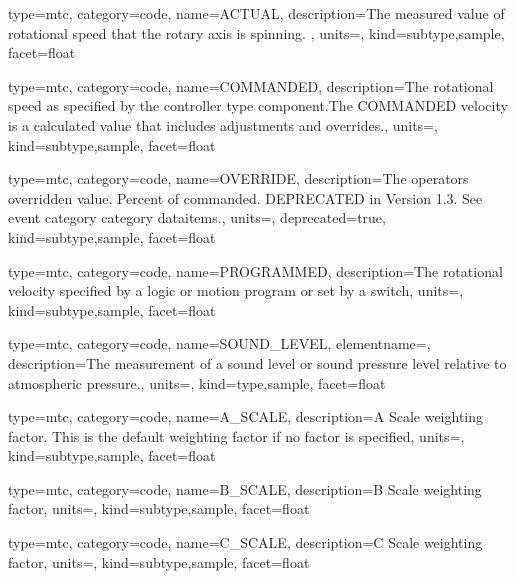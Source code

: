 {
  type=mtc,
  category=code,
  name={ACTUAL},
  description={The measured value of rotational speed that the rotary axis is spinning. },
  units=,
  kind={subtype,sample},
  facet={\gls{float}}
}


{
  type=mtc,
  category=code,
  name={COMMANDED},
  description={The rotational speed as specified by the \gls{controller} type component.The COMMANDED velocity is a calculated value that includes adjustments and overrides.},
  units=,
  kind={subtype,sample},
  facet={\gls{float}}
}


{
  type=mtc,
  category=code,
  name={OVERRIDE},
  description={The operators overridden value.  Percent of commanded. DEPRECATED in Version 1.3.   See \gls{event category} category \glspl{dataitem}.},
  units=,
  deprecated={true},
  kind={subtype,sample},
  facet={\gls{float}}
}


{
  type=mtc,
  category=code,
  name={PROGRAMMED},
  description={The rotational velocity specified by a logic or motion program or set by a switch},
  units=,
  kind={subtype,sample},
  facet={\gls{float}}
}


{
  type=mtc,
  category=code,
  name={SOUND\_LEVEL},
  elementname=,
  description={The measurement of a sound level or sound pressure level relative to atmospheric pressure.},
  units=,
  kind={type,sample},
  facet={\gls{float}}
}


{
  type=mtc,
  category=code,
  name={A\_SCALE},
  description={A Scale weighting factor.   This is the default weighting factor if no factor is specified},
  units=,
  kind={subtype,sample},
  facet={\gls{float}}
}


{
  type=mtc,
  category=code,
  name={B\_SCALE},
  description={B Scale weighting factor},
  units=,
  kind={subtype,sample},
  facet={\gls{float}}
}


{
  type=mtc,
  category=code,
  name={C\_SCALE},
  description={C Scale weighting factor},
  units=,
  kind={subtype,sample},
  facet={\gls{float}}
}


